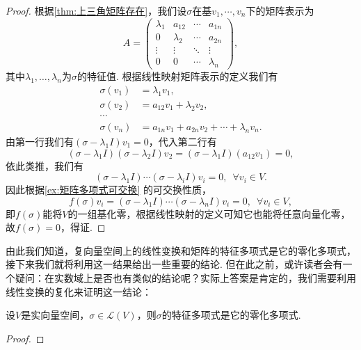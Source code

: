 \begin{enumerate}
          \begin{proof}
              根据\autoref{thm:上三角矩阵存在}，我们设$\sigma$在基$v_1,\cdots,v_n$下的矩阵表示为
              \[A=\begin{pmatrix}
                      \lambda_1 & a_{12}    & \cdots & a_{1n}    \\
                      0         & \lambda_2 & \cdots & a_{2n}    \\
                      \vdots    & \vdots    & \ddots & \vdots    \\
                      0         & 0         & \cdots & \lambda_n
                  \end{pmatrix},\]
              其中$\lambda_1,\ldots,\lambda_n$为$\sigma$的特征值. 根据线性映射矩阵表示的定义我们有
              \begin{align*}
                  \sigma(v_1) & =\lambda_1v_1,                            \\
                  \sigma(v_2) & =a_{12}v_1+\lambda_2v_2,                  \\
                  \cdots                                                  \\
                  \sigma(v_n) & =a_{1n}v_1+a_{2n}v_2+\cdots+\lambda_nv_n.
              \end{align*}
              由第一行我们有$(\sigma-\lambda_1 I)v_1=0$，代入第二行有
              \[(\sigma-\lambda_1 I)(\sigma-\lambda_2 I)v_2=(\sigma-\lambda_1 I)(a_{12}v_1)=0,\]
              依此类推，我们有
              \[(\sigma-\lambda_1 I)\cdots(\sigma-\lambda_i I)v_i=0,\enspace\forall v_i\in V.\]
              因此根据\autoref{ex:矩阵多项式可交换} 的可交换性质，
              \[f(\sigma)v_i=(\sigma-\lambda_1 I)\cdots(\sigma-\lambda_n I)v_i=0,\enspace\forall v_i\in V,\]
              即$f(\sigma)$能将$V$的一组基化零，根据线性映射的定义可知它也能将任意向量化零，故$f(\sigma)=0$，得证.
          \end{proof}
\end{enumerate}

由此我们知道，复向量空间上的线性变换和矩阵的特征多项式是它的零化多项式，接下来我们就将利用这一结果给出一些重要的结论. 但在此之前，或许读者会有一个疑问：在实数域上是否也有类似的结论呢？实际上答案是肯定的，我们需要利用线性变换的复化来证明这一结论：
\begin{theorem}{}{}
    设$V$是实向量空间，$\sigma\in \mathcal{L}(V)$，则$\sigma$的特征多项式是它的零化多项式.
\end{theorem}
\begin{proof}

\end{proof}


